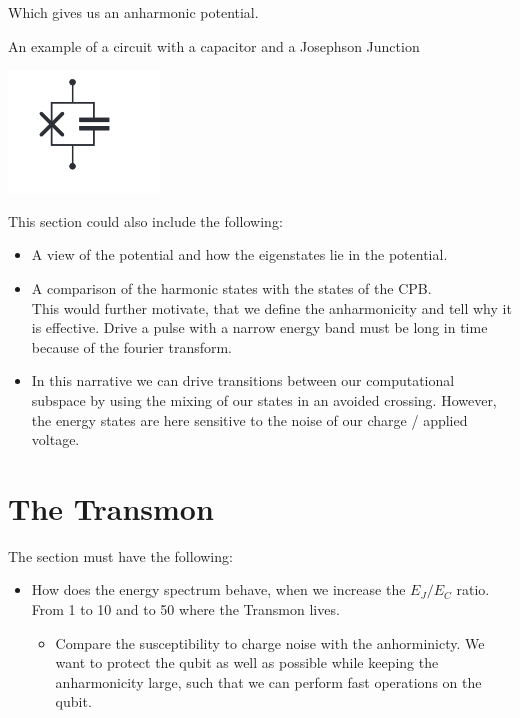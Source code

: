 Which gives us an anharmonic potential.

\begin{marginfigure}
    \caption{An example of a circuit with a capacitor and a Josephson Junction}
    \includegraphics[width = \textwidth]{tex/fig_for_text/CooperPairIsland.png}
    \label{fig:cooper_pair_island}
\end{marginfigure}
\vspace{1 cm}
This section could also include the following:
\begin{itemize}
    \item A view of the potential and how the eigenstates lie in the potential.
    \item A comparison of the harmonic states with the states of the CPB. \\
    This would further motivate, that we define the anharmonicity and tell why it is effective. Drive a pulse with a narrow energy band must be long in time because of the fourier transform. \\
    \item In this narrative we can drive transitions between our computational subspace by using the mixing of our states in an avoided crossing. However, the energy states are here sensitive to the noise of our charge / applied voltage. 
\end{itemize}

\section{The Transmon}
The section must have the following:
\begin{itemize}
    \item How does the energy spectrum behave, when we increase the $E_J / E_C$ ratio. From 1 to 10 and to 50 where the Transmon lives.
    \begin{itemize}
        \item Compare the susceptibility to charge noise with the anhorminicty. We want to protect the qubit as well as possible while keeping the anharmonicity large, such that we can perform fast operations on the qubit. 
    \end{itemize}
\end{itemize}